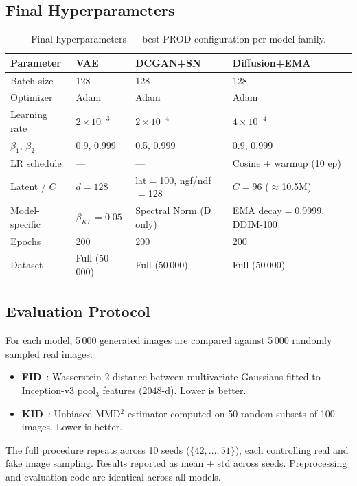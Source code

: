 \documentclass[runningheads]{llncs}
\begin{document}
\subsection{Final Hyperparameters}

\begin{table}[htbp]
\caption{Final hyperparameters — best PROD configuration per model family.}\label{tab:hp_all}
\centering
\begin{tabular}{llll}
\toprule
Parameter & VAE & DCGAN+SN & Diffusion+EMA \\
\midrule
Batch size    & 128                    & 128                    & 128 \\
Optimizer     & Adam                   & Adam                   & Adam \\
Learning rate & $2{\times}10^{-3}$     & $2{\times}10^{-4}$     & $4{\times}10^{-4}$ \\
$\beta_1$, $\beta_2$ & 0.9, 0.999      & 0.5, 0.999             & 0.9, 0.999 \\
LR schedule   & —                      & —                      & Cosine + warmup (10 ep) \\
Latent / $C$  & $d=128$                & lat$=$100, ngf/ndf$=$128 & $C=96$ ($\approx$10.5M) \\
Model-specific & $\beta_{KL}=0.05$      & Spectral Norm (D only) & EMA decay$=$0.9999, DDIM-100 \\
Epochs        & 200                    & 200                    & 200 \\
Dataset       & Full (50\,000)         & Full (50\,000)         & Full (50\,000) \\
\bottomrule
\end{tabular}
\end{table}

\subsection{Evaluation Protocol}

For each model, 5\,000 generated images are compared against 5\,000 randomly sampled real images:
\begin{itemize}
    \item \textbf{FID}~\cite{heusel2017}: Wasserstein-2 distance between multivariate Gaussians fitted to Inception-v3 pool$_3$ features (2048-d). Lower is better.
    \item \textbf{KID}~\cite{binkowski2018}: Unbiased MMD$^2$ estimator computed on 50 random subsets of 100 images. Lower is better.
\end{itemize}
The full procedure repeats across 10 seeds ($\{42,\ldots,51\}$), each controlling real and fake image sampling. Results reported as mean $\pm$ std across seeds. Preprocessing and evaluation code are identical across all models.
\end{document}
